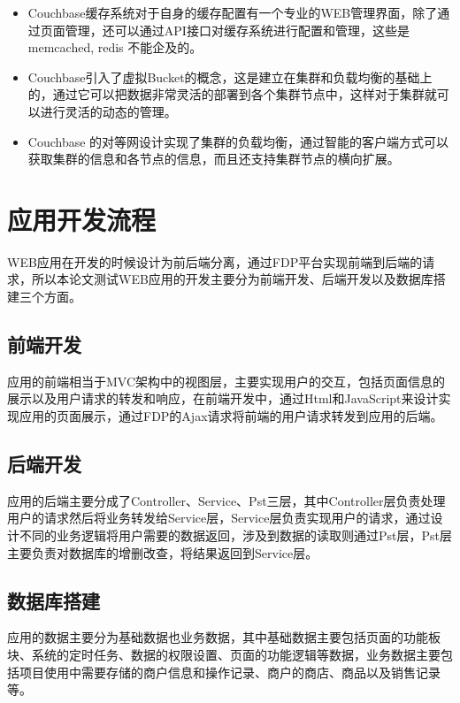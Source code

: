 \begin{itemize}

\item Couchbase缓存系统对于自身的缓存配置有一个专业的WEB管理界面，除了通过页面管理，还可以通过API接口对缓存系统进行配置和管理，这些是memcached, redis 不能企及的。
\item Couchbase引入了虚拟Bucket的概念，这是建立在集群和负载均衡的基础上的，通过它可以把数据非常灵活的部署到各个集群节点中，这样对于集群就可以进行灵活的动态的管理。
\item Couchbase 的对等网设计实现了集群的负载均衡，通过智能的客户端方式可以获取集群的信息和各节点的信息，而且还支持集群节点的横向扩展。

\end{itemize}

\section{应用开发流程}

WEB应用在开发的时候设计为前后端分离，通过FDP平台实现前端到后端的请求，所以本论文测试WEB应用的开发主要分为前端开发、后端开发以及数据库搭建三个方面。

\subsection{前端开发}

应用的前端相当于MVC架构中的视图层，主要实现用户的交互，包括页面信息的展示以及用户请求的转发和响应，在前端开发中，通过Html和JavaScript来设计实现应用的页面展示，通过FDP的Ajax请求将前端的用户请求转发到应用的后端。
\subsection{后端开发}

应用的后端主要分成了Controller、Service、Pst三层，其中Controller层负责处理用户的请求然后将业务转发给Service层，Service层负责实现用户的请求，通过设计不同的业务逻辑将用户需要的数据返回，涉及到数据的读取则通过Pst层，Pst层主要负责对数据库的增删改查，将结果返回到Service层。

\subsection{数据库搭建}

应用的数据主要分为基础数据也业务数据，其中基础数据主要包括页面的功能板块、系统的定时任务、数据的权限设置、页面的功能逻辑等数据，业务数据主要包括项目使用中需要存储的商户信息和操作记录、商户的商店、商品以及销售记录等。

